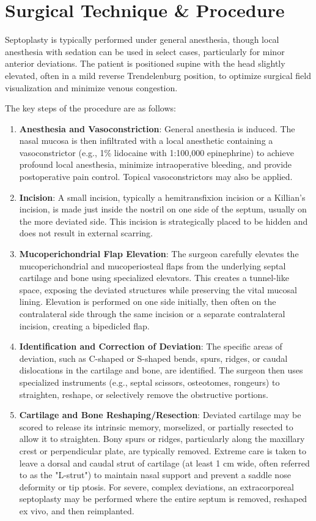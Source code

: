 \section*{Surgical Technique \& Procedure}
Septoplasty is typically performed under general anesthesia, though local anesthesia with sedation can be used in select cases, particularly for minor anterior deviations. The patient is positioned supine with the head slightly elevated, often in a mild reverse Trendelenburg position, to optimize surgical field visualization and minimize venous congestion.

The key steps of the procedure are as follows:
\begin{enumerate}
  \item \textbf{Anesthesia and Vasoconstriction}: General anesthesia is induced. The nasal mucosa is then infiltrated with a local anesthetic containing a vasoconstrictor (e.g., 1\% lidocaine with 1:100,000 epinephrine) to achieve profound local anesthesia, minimize intraoperative bleeding, and provide postoperative pain control. Topical vasoconstrictors may also be applied.
  \item \textbf{Incision}: A small incision, typically a hemitransfixion incision or a Killian's incision, is made just inside the nostril on one side of the septum, usually on the more deviated side. This incision is strategically placed to be hidden and does not result in external scarring.
  \item \textbf{Mucoperichondrial Flap Elevation}: The surgeon carefully elevates the mucoperichondrial and mucoperiosteal flaps from the underlying septal cartilage and bone using specialized elevators. This creates a tunnel-like space, exposing the deviated structures while preserving the vital mucosal lining. Elevation is performed on one side initially, then often on the contralateral side through the same incision or a separate contralateral incision, creating a bipedicled flap.
  \item \textbf{Identification and Correction of Deviation}: The specific areas of deviation, such as C-shaped or S-shaped bends, spurs, ridges, or caudal dislocations in the cartilage and bone, are identified. The surgeon then uses specialized instruments (e.g., septal scissors, osteotomes, rongeurs) to straighten, reshape, or selectively remove the obstructive portions.
  \item \textbf{Cartilage and Bone Reshaping/Resection}: Deviated cartilage may be scored to release its intrinsic memory, morselized, or partially resected to allow it to straighten. Bony spurs or ridges, particularly along the maxillary crest or perpendicular plate, are typically removed. Extreme care is taken to leave a dorsal and caudal strut of cartilage (at least 1 cm wide, often referred to as the "L-strut") to maintain nasal support and prevent a saddle nose deformity or tip ptosis. For severe, complex deviations, an extracorporeal septoplasty may be performed where the entire septum is removed, reshaped ex vivo, and then reimplanted.

\end{enumerate}

